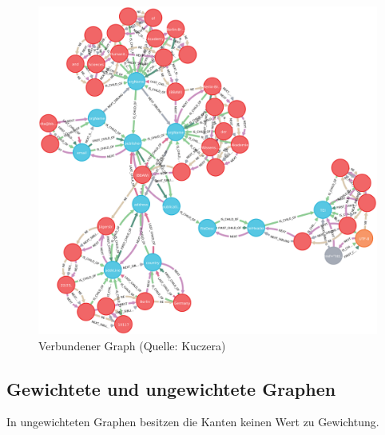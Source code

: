 \documentclass[ngerman,]{scrreprt}
\begin{document}
\begin{figure}
\centering
\includegraphics{Bilder/connectedGraph.png}
\caption{Verbundener Graph (Quelle: Kuczera)}
\label{verbundener}
\end{figure}


\hypertarget{gewichtete-und-ungewichtete-graphen}{%
\subsection{Gewichtete und ungewichtete Graphen}\label{gewichtete-und-ungewichtete-graphen}}

In ungewichteten Graphen besitzen die Kanten keinen Wert zu Gewichtung.
\end{document}
